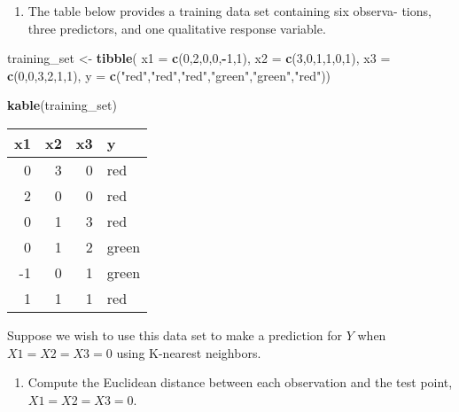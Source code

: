 \documentclass[]{book}
\newenvironment{Shaded}{\begin{snugshade}}{\end{snugshade}}
\newcommand{\KeywordTok}[1]{\textcolor[rgb]{0.13,0.29,0.53}{\textbf{#1}}}
\newcommand{\DataTypeTok}[1]{\textcolor[rgb]{0.13,0.29,0.53}{#1}}
\newcommand{\DecValTok}[1]{\textcolor[rgb]{0.00,0.00,0.81}{#1}}
\newcommand{\StringTok}[1]{\textcolor[rgb]{0.31,0.60,0.02}{#1}}
\newcommand{\OperatorTok}[1]{\textcolor[rgb]{0.81,0.36,0.00}{\textbf{#1}}}
\newcommand{\NormalTok}[1]{#1}
\providecommand{\tightlist}{%
  \setlength{\itemsep}{0pt}\setlength{\parskip}{0pt}}
\theoremstyle{definition}
\theoremstyle{definition}
\theoremstyle{definition}
\theoremstyle{remark}
\begin{document}
\begin{enumerate}
\def\labelenumi{\arabic{enumi}.}
\setcounter{enumi}{6}
\tightlist
\item
  The table below provides a training data set containing six observa-
  tions, three predictors, and one qualitative response variable.
\end{enumerate}

\begin{Shaded}
\begin{Highlighting}[]
\NormalTok{training_set <-}\StringTok{ }\KeywordTok{tibble}\NormalTok{(}
  \DataTypeTok{x1 =} \KeywordTok{c}\NormalTok{(}\DecValTok{0}\NormalTok{,}\DecValTok{2}\NormalTok{,}\DecValTok{0}\NormalTok{,}\DecValTok{0}\NormalTok{,}\OperatorTok{-}\DecValTok{1}\NormalTok{,}\DecValTok{1}\NormalTok{),}
  \DataTypeTok{x2 =} \KeywordTok{c}\NormalTok{(}\DecValTok{3}\NormalTok{,}\DecValTok{0}\NormalTok{,}\DecValTok{1}\NormalTok{,}\DecValTok{1}\NormalTok{,}\DecValTok{0}\NormalTok{,}\DecValTok{1}\NormalTok{),}
  \DataTypeTok{x3 =} \KeywordTok{c}\NormalTok{(}\DecValTok{0}\NormalTok{,}\DecValTok{0}\NormalTok{,}\DecValTok{3}\NormalTok{,}\DecValTok{2}\NormalTok{,}\DecValTok{1}\NormalTok{,}\DecValTok{1}\NormalTok{),}
  \DataTypeTok{y =} \KeywordTok{c}\NormalTok{(}\StringTok{"red"}\NormalTok{,}\StringTok{"red"}\NormalTok{,}\StringTok{"red"}\NormalTok{,}\StringTok{"green"}\NormalTok{,}\StringTok{"green"}\NormalTok{,}\StringTok{"red"}\NormalTok{))}

\KeywordTok{kable}\NormalTok{(training_set)}
\end{Highlighting}
\end{Shaded}

\begin{tabular}{r|r|r|l}
\hline
x1 & x2 & x3 & y\\
\hline
0 & 3 & 0 & red\\
\hline
2 & 0 & 0 & red\\
\hline
0 & 1 & 3 & red\\
\hline
0 & 1 & 2 & green\\
\hline
-1 & 0 & 1 & green\\
\hline
1 & 1 & 1 & red\\
\hline
\end{tabular}

Suppose we wish to use this data set to make a prediction for \(Y\) when
\(X1 = X2 = X3 = 0\) using K-nearest neighbors.

\begin{enumerate}
\def\labelenumi{(\alph{enumi})}
\tightlist
\item
  Compute the Euclidean distance between each observation and the test
  point, \(X1 = X2 = X3 = 0\).
\end{enumerate}
\end{document}
